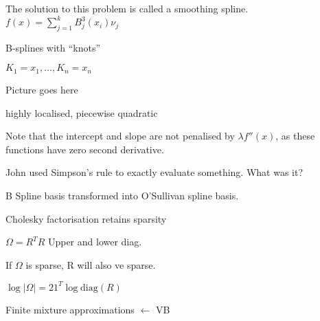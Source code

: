 \documentclass{amsart}
\begin{document}
The solution to this problem is called a smoothing spline. $f(x) = \sum_{j=1}^k B_j^3(x_i)\nu_j$

B-splines with ``knots''

$K_1=x_1, \ldots, K_n=x_n$

Picture goes here

highly localised, piecewise quadratic

Note that the intercept and slope are not penalised by $\lambda f''(x)$, as these 
functions have zero second derivative.

John used Simpson's rule to exactly evaluate something. What was it?

B Spline basis transformed into O'Sullivan spline basis.

Cholesky factorisation retains sparsity

$\Omega = R^T R$
Upper and lower diag.

If $\Omega$ is sparse, R will also ve sparse.

$\log{|\Omega|} = 21^T \log{\text{diag}(R)}$

Finite mixture approximations $\leftarrow$ VB
\end{document}
